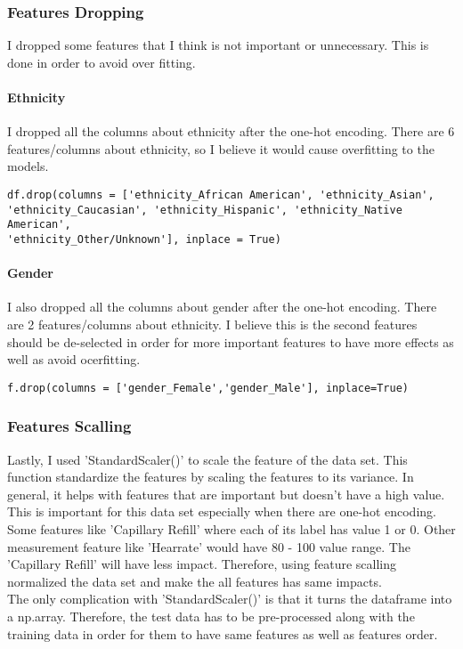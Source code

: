 \documentclass{article}
\begin{document}
\subsubsection{Features Dropping}
I dropped some features that I think is not important or unnecessary. This is done in order to avoid over fitting.
\paragraph{Ethnicity}
I dropped all the columns about ethnicity after the one-hot encoding. There are 6 features/columns about ethnicity, so I believe it would cause overfitting to the models. 
\begin{verbatim}
df.drop(columns = ['ethnicity_African American', 'ethnicity_Asian', 
'ethnicity_Caucasian', 'ethnicity_Hispanic', 'ethnicity_Native American', 
'ethnicity_Other/Unknown'], inplace = True) 
\end{verbatim}
\paragraph{Gender}
I also dropped all the columns about gender after the one-hot encoding. There are 2 features/columns about ethnicity. I believe this is the second features should be de-selected in order for more important features to have more effects as well as avoid ocerfitting. 
\begin{verbatim}
f.drop(columns = ['gender_Female','gender_Male'], inplace=True)
\end{verbatim}
\subsubsection{Features Scalling}
Lastly, I used 'StandardScaler()' to scale the feature of the data set. This function standardize the features by scaling the features to its variance. In general, it helps with features that are important but doesn't have a high value. This is important for this data set especially when there are one-hot encoding. Some features like 'Capillary Refill' where each of its label has value 1 or 0. Other measurement feature like 'Hearrate' would have 80 - 100 value range. The 'Capillary Refill' will have less impact. Therefore, using feature scalling normalized the data set and make the all features has same impacts. \\
The only complication with 'StandardScaler()' is that it turns the dataframe into a np.array. Therefore, the test data has to be pre-processed along with the training data in order for them to have same features as well as features order. 
\end{document}

